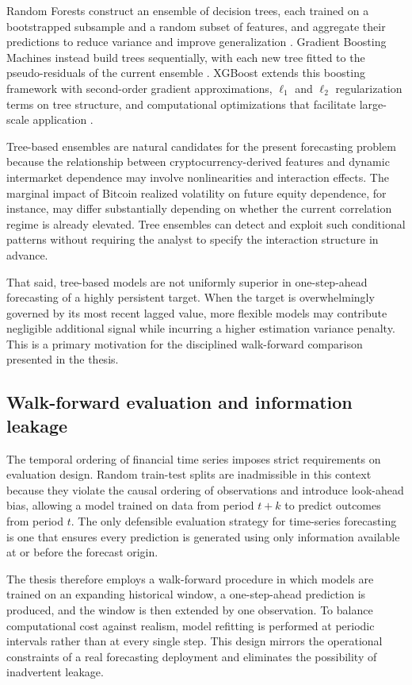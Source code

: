 Random Forests construct an ensemble of decision trees, each trained on a bootstrapped subsample and a random subset of features, and aggregate their predictions to reduce variance and improve generalization \cite{breiman2001}. Gradient Boosting Machines instead build trees sequentially, with each new tree fitted to the pseudo-residuals of the current ensemble \cite{friedman2001}. XGBoost extends this boosting framework with second-order gradient approximations, $\ell_1$ and $\ell_2$ regularization terms on tree structure, and computational optimizations that facilitate large-scale application \cite{chen2016}.

Tree-based ensembles are natural candidates for the present forecasting problem because the relationship between cryptocurrency-derived features and dynamic intermarket dependence may involve nonlinearities and interaction effects. The marginal impact of Bitcoin realized volatility on future equity dependence, for instance, may differ substantially depending on whether the current correlation regime is already elevated. Tree ensembles can detect and exploit such conditional patterns without requiring the analyst to specify the interaction structure in advance.

That said, tree-based models are not uniformly superior in one-step-ahead forecasting of a highly persistent target. When the target is overwhelmingly governed by its most recent lagged value, more flexible models may contribute negligible additional signal while incurring a higher estimation variance penalty. This is a primary motivation for the disciplined walk-forward comparison presented in the thesis.

\subsection{Walk-forward evaluation and information leakage}

The temporal ordering of financial time series imposes strict requirements on evaluation design. Random train-test splits are inadmissible in this context because they violate the causal ordering of observations and introduce look-ahead bias, allowing a model trained on data from period $t + k$ to predict outcomes from period $t$. The only defensible evaluation strategy for time-series forecasting is one that ensures every prediction is generated using only information available at or before the forecast origin.

The thesis therefore employs a walk-forward procedure in which models are trained on an expanding historical window, a one-step-ahead prediction is produced, and the window is then extended by one observation. To balance computational cost against realism, model refitting is performed at periodic intervals rather than at every single step. This design mirrors the operational constraints of a real forecasting deployment and eliminates the possibility of inadvertent leakage.


